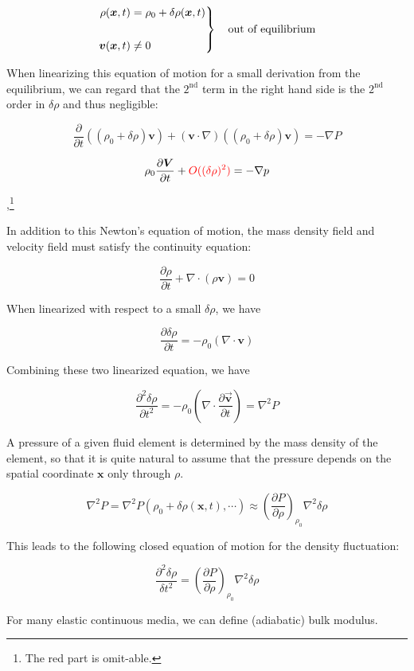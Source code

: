 \[\left.\begin{split}
\rho(\bm{x},t) &= \rho_0 + \delta\rho(\bm{x},t)\\
\ & \ \\
\bm{v}(\bm{x},t) &\neq 0
\end{split}\right\}\text{\quad out of equilibrium} \]

When linearizing this equation of motion for a small derivation from the equilibrium, we can regard that the $2^{\text{nd}}$ term in the right hand side is the $2^{\text{nd}}$ order in $\delta\rho$ and thus negligible:

\[\frac{\partial}{\partial t}\left((\rho_0+\delta\rho)\bm{v}\right) + (\bm{v}\cdot\nabla)\left((\rho_0+\delta\rho)\bm{v}\right) = -\nabla P \]

\[\rho_0\frac{\partial\bm{V}}{\partial t} + {\color{red}{O((\delta\rho)^2)}}= -\nabla p \]

,\footnote{The red part is omit-able. }

In addition to this Newton's equation of motion, the mass density field and velocity field must satisfy the continuity equation: 

\[\frac{\partial \rho}{\partial t}+\nabla\cdot(\rho\bm{v}) = 0 \]

When linearized with respect to a small $\delta \rho$, we have

\[\frac{\partial\delta\rho}{\partial t} = -\rho_0(\nabla\cdot\bm{v}) \]

Combining these two linearized equation, we have

\[\frac{\partial^2\delta\rho}{\partial t^2}= -\rho_0(\nabla\cdot\frac{\partial\vec{\bm{v}}}{\partial t}) = \nabla^2 P \]

A pressure of a given fluid element is determined by the mass density of the element, so that it is quite natural to assume that the pressure depends on the spatial coordinate $\bm{x}$ only through $\rho$. 

\[\nabla^2 P = \nabla^2 P(\rho_0+\delta\rho(\bm{x},t),\cdots) \approx\left(\frac{\partial P}{\partial\rho}\right)_{\rho_0}\nabla^2\delta\rho \]

This leads to the following closed equation of motion for the density fluctuation:

\[\frac{\partial^2\delta\rho}{\delta t^2} = \left(\frac{\partial P}{\partial \rho}\right)_{\rho_0}\nabla^2\delta\rho \]

For many elastic continuous media, we can define (adiabatic) bulk modulus. 


